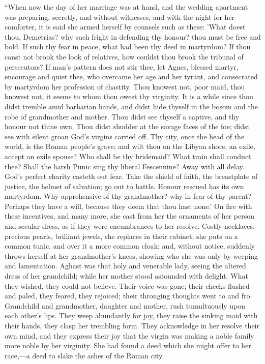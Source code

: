 ``When now the day of her marriage was at hand, and the wedding
apartment was preparing, secretly, and without witnesses, and with the
night for her comforter, it is said she armed herself by counsels such
as these: 'What doest thou, Demetrias? why such fright in defending
thy honour? thou must be free and bold. If such thy fear in peace,
what had been thy deed in martyrdom? If thou canst not brook the look
of relatives, how couldst thou brook the tribunal of persecutors? If
man's pattern does not stir thee, let Agnes, blessed martyr, encourage
and quiet thee, who overcame her age and her tyrant, and consecrated
by martyrdom her profession of chastity. Thou knowest not, poor maid,
thou knowest not, it seems to whom thou owest thy virginity. It is a
while since thou didst tremble amid barbarian hands, and didst hide
thyself in the bosom and the robe of grandmother and mother. Thou
didst see thyself a captive, and thy honour not thine own. Thou didst
shudder at the savage faces of the foe; didst see with silent groan
God's virgins carried off. Thy city, once the head of the world, is
the Roman people's grave; and wilt thou on the Libyan shore, an exile,
accept an exile spouse? Who shall be thy bridemaid? What train shall
conduct thee? Shall the harsh Punic sing thy liberal Fescennine? Away
with all delay. God's perfect charity casteth out fear. Take the
shield of faith, the breastplate of justice, the helmet of salvation;
go out to battle. Honour rescued has its own martyrdom. Why
apprehensive of thy grandmother? why in fear of thy parent? Perhaps
they have a will, because they deem that thou hast none.' On fire with
these incentives, and many more, she cast from her the ornaments of
her person and secular dress, as if they were encumbrances to her
resolve. Costly necklaces, precious pearls, brilliant jewels, she
replaces in their cabinet; she puts on a common tunic, and
over it a more common cloak; and, without notice, suddenly throws
herself at her grandmother's knees, showing who she was only by
weeping and lamentation. Aghast was that holy and venerable lady,
seeing the altered dress of her grandchild; while her mother stood
astounded with delight. What they wished, they could not believe.
Their voice was gone; their cheeks flushed and paled, they feared,
they rejoiced; their thronging thoughts went to and fro. Grandchild
and grandmother, daughter and mother, rush tumultuously upon each
other's lips. They weep abundantly for joy, they raise the sinking
maid with their hands, they clasp her trembling form. They acknowledge
in her resolve their own mind, and they express their joy that the
virgin was making a noble family more noble by her virginity. She had
found a deed which she might offer to her race,—a deed to slake the
ashes of the Roman city.

